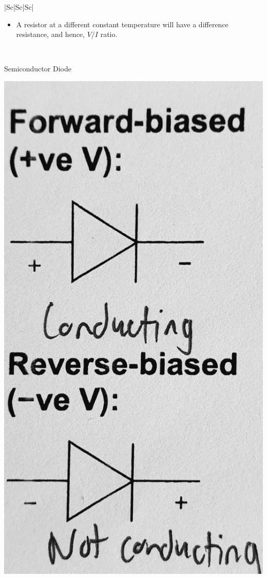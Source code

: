 \documentclass[oneside]{book}
\begin{document}
\begin{itemize}
\begin{longtable}{|Sc|Sc|Sc|}
\begin{minipage}{0.3\textwidth}
\begin{itemize}
                \item A resistor at a different constant temperature will have a difference resistance, and hence, \(V/I\) ratio. 
            \end{itemize}
        \end{minipage}\\
        \hline
        \begin{minipage}{0.25\textwidth}
            Semiconductor Diode\\[5mm]
            \begin{center}
                \includegraphics[scale=0.08]{../images/ForwardReverseBias.jpg}

\end{center}
\end{minipage}
\end{longtable}
\end{itemize}
\end{document}
